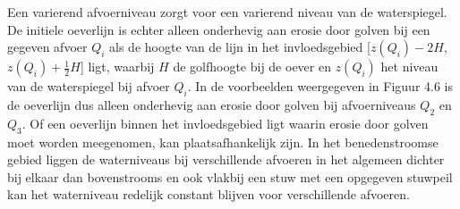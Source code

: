 Een varierend afvoerniveau zorgt voor een varierend niveau van de waterspiegel.
De initiele oeverlijn is echter alleen onderhevig aan erosie door golven bij een gegeven afvoer $Q_i$ als de hoogte van de lijn in het invloedsgebied [$z(Q_i) - 2 H$, $z(Q_i) + \frac{1}{2} H$] ligt, waarbij $H$ de golfhoogte bij de oever en $z(Q_i)$ het niveau van de waterspiegel bij afvoer $Q_i$.
In de voorbeelden weergegeven in Figuur 4.6 is de oeverlijn dus alleen onderhevig aan erosie door golven bij afvoerniveaus $Q_2$ en $Q_3$.
Of een oeverlijn binnen het invloedsgebied ligt waarin erosie door golven moet worden meegenomen, kan plaatsafhankelijk zijn.
In het benedenstroomse gebied liggen de waterniveaus bij verschillende afvoeren in het algemeen dichter bij elkaar dan bovenstrooms en ook vlakbij een stuw met een opgegeven stuwpeil kan het waterniveau redelijk constant blijven voor verschillende afvoeren.

